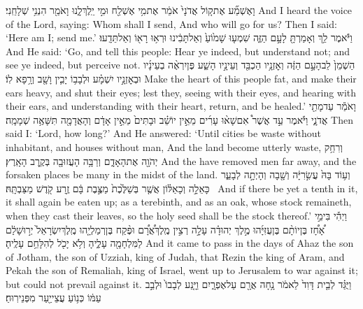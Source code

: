 {וָאֶשְׁמַ֞ע אֶת\maqqaf ק֤וֹל אֲדֹנָי֙ אֹמֵ֔ר אֶת\maqqaf מִ֥י אֶשְׁלַ֖ח וּמִ֣י יֵֽלֶךְ\maqqaf לָ֑נוּ וָאֹמַ֖ר הִנְנִ֥י שְׁלָחֵֽנִי׃}
{And I heard the voice of the Lord, saying: Whom shall I send, And who will go for us? Then I said: ‘Here am I; send me.’}
{וַיֹּ֕אמֶר לֵ֥ךְ וְאָמַרְתָּ֖ לָעָ֣ם הַזֶּ֑ה שִׁמְע֤וּ שָׁמ֙וֹעַ֙ וְאַל\maqqaf תָּבִ֔ינוּ וּרְא֥וּ רָא֖וֹ וְאַל\maqqaf תֵּדָֽעוּ׃}
{And He said: ‘Go, and tell this people: Hear ye indeed, but understand not; and see ye indeed, but perceive not.}
{הַשְׁמֵן֙ לֵב\maqqaf הָעָ֣ם הַזֶּ֔ה וְאׇזְנָ֥יו הַכְבֵּ֖ד וְעֵינָ֣יו הָשַׁ֑ע פֶּן\maqqaf יִרְאֶ֨ה בְעֵינָ֜יו וּבְאׇזְנָ֣יו יִשְׁמָ֗ע וּלְבָב֥וֹ יָבִ֛ין וָשָׁ֖ב וְרָ֥פָא לֽוֹ׃}
{Make the heart of this people fat, and make their ears heavy, and shut their eyes; lest they, seeing with their eyes, and hearing with their ears, and understanding with their heart, return, and be healed.’}
{וָאֹמַ֕ר עַד\maqqaf מָתַ֖י אֲדֹנָ֑י וַיֹּ֡אמֶר עַ֣ד אֲשֶׁר֩ אִם\maqqaf שָׁא֨וּ עָרִ֜ים מֵאֵ֣ין יוֹשֵׁ֗ב וּבָתִּים֙ מֵאֵ֣ין אָדָ֔ם וְהָאֲדָמָ֖ה תִּשָּׁאֶ֥ה שְׁמָמָֽה׃}
{Then said I: ‘Lord, how long?’ And He answered: ‘Until cities be waste without inhabitant, and houses without man, And the land become utterly waste,}
{וְרִחַ֥ק יְהֹוָ֖ה אֶת\maqqaf הָאָדָ֑ם וְרַבָּ֥ה הָעֲזוּבָ֖ה בְּקֶ֥רֶב הָאָֽרֶץ׃}
{And the \lord\space have removed men far away, and the forsaken places be many in the midst of the land.}
{וְע֥וֹד בָּהּ֙ עֲשִׂ֣רִיָּ֔ה וְשָׁ֖בָה וְהָיְתָ֣ה לְבָעֵ֑ר כָּאֵלָ֣ה וְכָאַלּ֗וֹן אֲשֶׁ֤ר בְּשַׁלֶּ֙כֶת֙ מַצֶּ֣בֶת בָּ֔ם זֶ֥רַע קֹ֖דֶשׁ מַצַּבְתָּֽהּ׃ \petucha }
{And if there be yet a tenth in it, it shall again be eaten up; as a terebinth, and as an oak, whose stock remaineth, when they cast their leaves, so the holy seed shall be the stock thereof.’}
\newperek
{}
{וַיְהִ֡י בִּימֵ֣י אָ֠חָ֠ז בֶּן\maqqaf יוֹתָ֨ם בֶּן\maqqaf עֻזִּיָּ֜הוּ מֶ֣לֶךְ יְהוּדָ֗ה עָלָ֣ה רְצִ֣ין מֶֽלֶךְ\maqqaf אֲ֠רָ֠ם וּפֶ֨קַח בֶּן\maqqaf רְמַלְיָ֤הוּ מֶֽלֶךְ\maqqaf יִשְׂרָאֵל֙ יְר֣וּשָׁלַ֔͏ִם לַמִּלְחָמָ֖ה עָלֶ֑יהָ וְלֹ֥א יָכֹ֖ל לְהִלָּחֵ֥ם עָלֶֽיהָ׃}
{And it came to pass in the days of Ahaz the son of Jotham, the son of Uzziah, king of Judah, that Rezin the king of Aram, and Pekah the son of Remaliah, king of Israel, went up to Jerusalem to war against it; but could not prevail against it.}
{וַיֻּגַּ֗ד לְבֵ֤ית דָּוִד֙ לֵאמֹ֔ר נָ֥חָה אֲרָ֖ם עַל\maqqaf אֶפְרָ֑יִם וַיָּ֤נַע לְבָבוֹ֙ וּלְבַ֣ב עַמּ֔וֹ כְּנ֥וֹעַ עֲצֵי\maqqaf יַ֖עַר מִפְּנֵי\maqqaf רֽוּחַ׃ \setuma }
